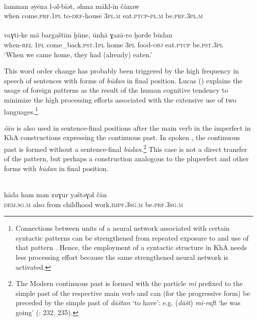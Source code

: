 \documentclass[output=paper,nonflat]{langsci/langscibook}
\begin{document}
\ea {}\\
\gll lamman əyēna l-əl-bīət, əhma mākl-īn čānaw\\
     when come.\textsc{prf.1pl} to-\textsc{def}-house 3\textsc{pl}.\textsc{m} eat.\textsc{ptcp-pl.m} be.\textsc{prf}.\textsc{3pl.m}\\

\\
\gll vaɣti-ke mā bargaštīm ḫūne, ūnhā ɣazā-ro ḫorde būdan  \\
     when-\textsc{rel} \textsc{1pl} come\_back.\textsc{pst}.\textsc{1pl} home 3\textsc{pl} food-\textsc{obj} eat.\textsc{ptcp} be.\textsc{pst}.\textsc{3pl}\\
\glt ‘When we came home, they had (already) eaten.’
\z
\z

This {word order} change has probably been triggered by the high {frequency} in speech of  sentences with forms of \textit{būdan} in final position. Lucas (\citeyear[295]{Lucas2012}) explains the usage of foreign patterns as the result of the human cognitive tendency to minimize the high processing efforts associated with the extensive use of two languages.\footnote{{Connections between units of a neural network associated with certain syntactic patterns can be strengthened from repeated exposure to and use of that pattern} {\citep[291]{Lucas2012}. Hence, the employment of a  syntactic structure in KhA needs less processing effort because the same strengthened neural network is activated.}}

\textit{čān} is also used in sentence-final positions after the main verb in the imperfect in KhA constructions expressing the continuous past. In spoken , the continuous past is formed without a sentence-final \textit{būdan}.\footnote{The Modern   continuous past is formed with the particle \textit{mī} prefixed to the simple past of the respective main verb and can (for the progressive form) be preceded by the simple past of \textit{dāštan} ‘to have’: e.g. (\textit{dāšt}) \textit{mī-raft} ‘he was going’ (\citealt{Majidi1990}: 232, 235).} This case is not a direct {transfer} of the  pattern, but perhaps a construction analogous to the pluperfect and other  forms with \textit{būdan} in final position. 

\ea
{}\\
\gll hāda ham mən zuɣur yəštəɣəl čān  \\
     \textsc{dem}.\textsc{sg}.\textsc{m} also from childhood work.\textsc{impf.3sg.m} be.\textsc{prf.3sg.m}\\
 
\end{document}
